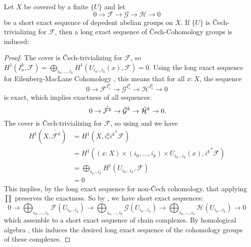 \begin{theorem}%
  \label{chech-les}
  Let $X$ be covered by a finite $\{U\}$ and let 
  \[ 0\to \mathcal F\to \mathcal G\to \mathcal H\to 0\]
  be a short exact sequence of depedent abelian groups on $X$.
  If $\{U\}$ is \v{C}ech-trivializing for $\mathcal F$,
  then a long exact sequence of \v{C}ech-Cohomology groups is induced:
  \begin{center}
  \end{center}
\end{theorem}

\begin{proof}
  The cover is \v{C}ech-trivializing for $\mathcal F$,
  so $H^1(I_x^k,\mathcal F)=\bigoplus_{i_0,\dots,i_k} H^1(U_{i_0\dots i_k}(x),\mathcal F)=0$.
  Using the long exact sequence for Eilenberg-MacLane Cohomology ,
  this means that for all $x:X$, the sequence
  \[
    0\to {\mathcal F}^{I^k_x}\to {\mathcal G}^{I^k_x}\to {\mathcal H}^{I^k_x}\to 0
  \]
  is exact, which implies exactness of all sequences:
  \[
    0\to \check{\mathcal F^k}\to \check{\mathcal G}^k\to \check{\mathcal H}^k\to 0
    \rlap{.}
  \]
  The cover is \v{C}ech-trivializing for $\mathcal F$, so using  and  we have
  \begin{align*}
    H^1(X,\check{\mathcal F^k})&=H^1(X,i_\ast^k {i^k}^\ast\mathcal F) \\
                               &=H^1((x:X)\times (i_0,\dots,i_k)\times U_{i_0\dots i_k}(x),{i^k}^\ast\mathcal F) \\
                               &=\bigoplus_{i_0\dots i_k} H^1(U_{i_0\dots i_k},\mathcal F) \\
                               &=0    
  \end{align*}
  This implies, by the long exact sequence for non-\v{C}ech cohomology, that applying $\prod$ preserves the exactness.
  So by , we have short exact sequences:
  \[
  0\to \bigoplus_{i_0,\dots,i_k}\mathcal F(U_{i_0\dots i_k}) \to \bigoplus_{i_0,\dots,i_k}\mathcal G(U_{i_0\dots i_k}) \to \bigoplus_{i_0,\dots,i_k}\mathcal H(U_{i_0\dots i_k})\to 0
  \]
  which assemble to a short exact sequence of chain complexes.
  By homological algebra \cite[\href{https://stacks.math.columbia.edu/tag/0117}{Tag 0117}]{stacks-project}, this induces the desired long exact sequence of the cohomology groups of these complexes.
\end{proof}

